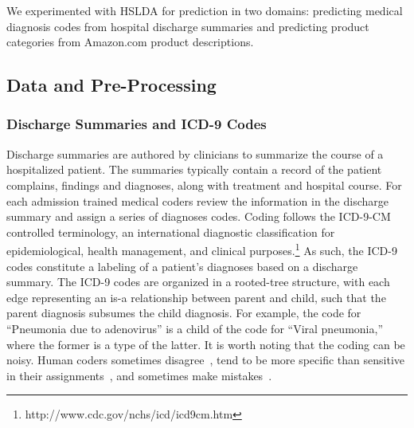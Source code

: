 
We experimented with HSLDA for prediction in two domains: predicting medical
diagnosis codes from hospital discharge summaries and predicting product
categories from Amazon.com product descriptions.


\subsection{Data and Pre-Processing}

\subsubsection{Discharge Summaries and ICD-9 Codes}

Discharge summaries are authored by clinicians to summarize the course of a
hospitalized patient. The summaries typically contain a record of the patient
complains, findings and diagnoses, along with treatment and hospital course.
For each admission trained medical coders review the information in the
discharge summary and assign a series of diagnoses codes. Coding follows the
ICD-9-CM controlled terminology, an international diagnostic classification for
epidemiological, health management, and clinical
purposes.\footnote{http://www.cdc.gov/nchs/icd/icd9cm.htm} As such, the ICD-9
codes constitute a labeling of a patient's diagnoses based on a discharge
summary. The ICD-9 codes are organized in a rooted-tree structure, with each
edge representing an is-a relationship between parent and child, such that the
parent diagnosis subsumes the child diagnosis. For example, the code for
{}``Pneumonia due to adenovirus'' is a child of the code for {}``Viral
pneumonia,'' where the former is a type of the latter.  It is worth noting that
the coding can be noisy. Human coders sometimes disagree~\cite{Challenge07},
tend to be more specific than sensitive in their
assignments~\cite{Birmetal2005}, and sometimes make
mistakes~\cite{FarzandipourEtAl10}. 

